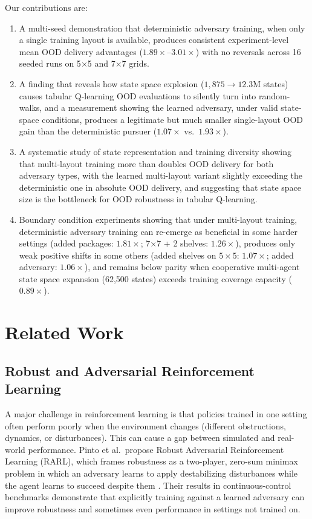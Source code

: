 \documentclass[sigconf]{aamas}
\begin{document}
Our contributions are:
\begin{enumerate}
  \item A multi-seed demonstration that deterministic
        adversary training, when only a single training layout is available, produces
        consistent experiment-level mean OOD delivery advantages
        ($1.89\times$--$3.01\times$) with no reversals across 16 seeded runs on 5$\times$5 and 7$\times$7 grids.
  \item A finding that reveals how state space explosion ($1{,}875
        \to 12.3\text{M}$ states) causes tabular Q-learning OOD evaluations to silently turn into random-walks, and a measurement showing the
        learned adversary, under valid state-space conditions, produces a legitimate
        but much smaller single-layout OOD gain than the deterministic pursuer ($1.07\times$ vs.\ $1.93\times$).
  \item A systematic study of state representation and training diversity showing
        that multi-layout training more than doubles OOD delivery for both adversary
        types, with the learned multi-layout variant slightly exceeding the deterministic one in
        absolute OOD delivery, and suggesting that state space size is the bottleneck for OOD robustness in
        tabular Q-learning.
 \item Boundary condition experiments showing that under multi-layout training,
        deterministic adversary training can re-emerge as beneficial in some harder
        settings (added packages: $1.81\times$; 7$\times$7 + 2 shelves: $1.26\times$),
        produces only weak positive shifts in some others (added shelves on $5\times5$:
        $1.07\times$; added adversary: $1.06\times$), and remains below parity when
        cooperative multi-agent state space expansion (62{,}500 states) exceeds
        training coverage capacity ($0.89\times$).
\end{enumerate}

\section{Related Work}

\subsection*{Robust and Adversarial Reinforcement Learning}
A major challenge in reinforcement learning is that policies trained in one setting often perform poorly when the environment changes (different obstructions, dynamics, or disturbances). This can cause a gap between simulated and real-world performance. Pinto et al.~propose Robust Adversarial Reinforcement Learning (RARL), which frames robustness as a two-player, zero-sum minimax problem in which an adversary learns to apply destabilizing disturbances while the agent learns to succeed despite them \cite{pinto2017rarl}. Their results in continuous-control benchmarks demonstrate that explicitly training against a learned adversary can improve robustness and sometimes even performance in settings not trained on.
\end{document}
